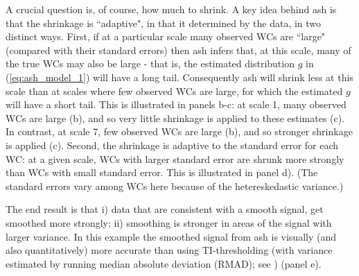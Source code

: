 \documentclass[12pt]{article}
\begin{document}
A crucial question is, of course, how much to shrink. A key idea behind ash is that the shrinkage is ``adaptive", in that it
determined by the data, in two distinct ways. First, if at a particular scale many observed WCs are ``large" (compared with their standard errors)
then ash infers that, at this scale, many of the true WCs may also be large - that is, the estimated distribution $g$ in (\ref{eq:ash_model_1}) will have a long tail.
Consequently ash will shrink less at this scale than at scales where few observed
WCs are large, for which the estimated $g$ will have a short tail. This is illustrated in panels b-c: at scale 1, many observed WCs are large (b), and so very little shrinkage is applied to these estimates (c).
In contrast, at scale 7, few observed WCs are large (b), and so stronger shrinkage is applied (c). Second, the shrinkage is adaptive to 
the standard error for each WC: at a given scale, WCs with larger standard error are shrunk more strongly than WCs with small standard error.
This is illustrated in panel d). (The standard errors vary among WCs here because of the hetereskedastic variance.)

 The end result is that i) data that are consistent with a smooth signal, get smoothed more strongly; ii) smoothing is stronger in areas
 of the signal with larger variance. In this example the smoothed signal from ash is visually (and also quantitatively) more accurate than
 using TI-thresholding (with variance estimated by running median absolute deviation (RMAD); see \cite{Gao1997Wavelet}) (panel e).
\end{document}
